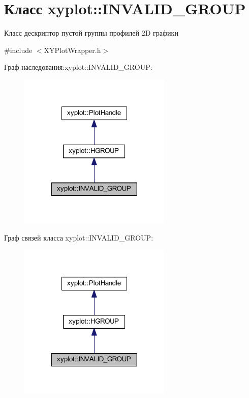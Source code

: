 \hypertarget{classxyplot_1_1_i_n_v_a_l_i_d___g_r_o_u_p}{\section{Класс xyplot\-:\-:I\-N\-V\-A\-L\-I\-D\-\_\-\-G\-R\-O\-U\-P}
\label{classxyplot_1_1_i_n_v_a_l_i_d___g_r_o_u_p}
}


Класс дескриптор пустой группы профилей 2\-D графики  




{\ttfamily \#include $<$X\-Y\-Plot\-Wrapper.\-h$>$}



Граф наследования\-:xyplot\-:\-:I\-N\-V\-A\-L\-I\-D\-\_\-\-G\-R\-O\-U\-P\-:\nopagebreak
\begin{figure}[H]
\begin{center}
\leavevmode
\includegraphics[width=206pt]{classxyplot_1_1_i_n_v_a_l_i_d___g_r_o_u_p__inherit__graph}
\end{center}
\end{figure}


Граф связей класса xyplot\-:\-:I\-N\-V\-A\-L\-I\-D\-\_\-\-G\-R\-O\-U\-P\-:\nopagebreak
\begin{figure}[H]
\begin{center}
\leavevmode
\includegraphics[width=206pt]{classxyplot_1_1_i_n_v_a_l_i_d___g_r_o_u_p__coll__graph}
\end{center}
\end{figure}
